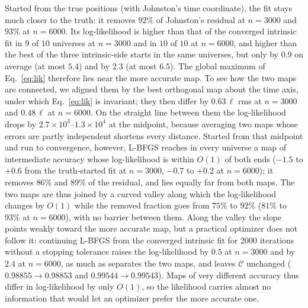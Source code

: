 \documentclass[prd,twocolumn,superscriptaddress,nofootinbib,amsmath,amssymb,floatfix]{revtex4-2}
\begin{document}
Started from the true positions (with Johnston's time coordinate), the fit stays much closer to the truth: it removes $92\%$ of Johnston's residual at $n=3000$ and $93\%$ at $n=6000$. Its log-likelihood is higher than that of the converged intrinsic fit in $9$ of $10$ universes at $n=3000$ and in $10$ of $10$ at $n=6000$, and higher than the best of the three intrinsic-side starts in the same universes, but only by $0.9$ on average (at most $5.4$) and by $2.3$ (at most $6.5$). The global maximum of Eq.~\eqref{eq:lik} therefore lies near the more accurate map. To see how the two maps are connected, we aligned them by the best orthogonal map about the time axis, under which Eq.~\eqref{eq:lik} is invariant; they then differ by $0.63\,\ell$ rms at $n=3000$ and $0.48\,\ell$ at $n=6000$. On the straight line between them the log-likelihood drops by $2.7\times10^3$--$1.3\times10^4$ at the midpoint, because averaging two maps whose errors are partly independent shortens every distance. Started from that midpoint and run to convergence, however, L-BFGS reaches in every universe a map of intermediate accuracy whose log-likelihood is within $O(1)$ of both ends ($-1.5$ to $+0.6$ from the truth-started fit at $n=3000$, $-0.7$ to $+0.2$ at $n=6000$); it removes $86\%$ and $89\%$ of the residual, and lies equally far from both maps. The two maps are thus joined by a curved valley along which the log-likelihood changes by $O(1)$ while the removed fraction goes from $75\%$ to $92\%$ ($81\%$ to $93\%$ at $n=6000$), with no barrier between them. Along the valley the slope points weakly toward the more accurate map, but a practical optimizer does not follow it: continuing L-BFGS from the converged intrinsic fit for 2000 iterations without a stopping tolerance raises the log-likelihood by $0.5$ at $n=3000$ and by $2.4$ at $n=6000$, as much as separates the two maps, and leaves $\mathcal C$ unchanged ($0.98855\to0.98853$ and $0.99544\to0.99543$). Maps of very different accuracy thus differ in log-likelihood by only $O(1)$, so the likelihood carries almost no information that would let an optimizer prefer the more accurate one.
\end{document}
